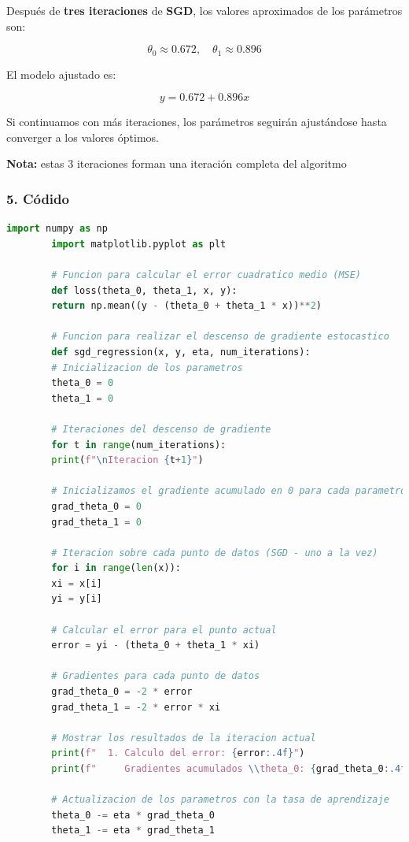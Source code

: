 \documentclass[a5paper]{article}
\begin{document}
	
	Después de \textbf{tres iteraciones} de \textbf{SGD}, los valores aproximados de los parámetros son:
	
	\[
	\theta_0 \approx 0.672, \quad \theta_1 \approx 0.896
	\]
	
	El modelo ajustado es:
	
	\[
	y = 0.672 + 0.896x
	\]
	
	Si continuamos con más iteraciones, los parámetros seguirán ajustándose hasta converger a los valores óptimos.
	
	\textbf{Nota:} estas 3 iteraciones forman una iteración completa del algoritmo
	
	\subsubsection*{5. Códido}
	\begin{lstlisting}[language=Python, caption=Regresión Lineal con SGD, frame=single]
		import numpy as np
		import matplotlib.pyplot as plt
		
		# Funcion para calcular el error cuadratico medio (MSE)
		def loss(theta_0, theta_1, x, y):
		return np.mean((y - (theta_0 + theta_1 * x))**2)
		
		# Funcion para realizar el descenso de gradiente estocastico
		def sgd_regression(x, y, eta, num_iterations):
		# Inicializacion de los parametros
		theta_0 = 0
		theta_1 = 0
		
		# Iteraciones del descenso de gradiente
		for t in range(num_iterations):
		print(f"\nIteracion {t+1}")
		
		# Inicializamos el gradiente acumulado en 0 para cada parametro
		grad_theta_0 = 0
		grad_theta_1 = 0
		
		# Iteracion sobre cada punto de datos (SGD - uno a la vez)
		for i in range(len(x)):
		xi = x[i]
		yi = y[i]
		
		# Calcular el error para el punto actual
		error = yi - (theta_0 + theta_1 * xi)
		
		# Gradientes para cada punto de datos
		grad_theta_0 = -2 * error
		grad_theta_1 = -2 * error * xi
		
		# Mostrar los resultados de la iteracion actual
		print(f"  1. Calculo del error: {error:.4f}")
		print(f"     Gradientes acumulados \\theta_0: {grad_theta_0:.4f}, \\theta_1: {grad_theta_1:.4f}")
		
		# Actualizacion de los parametros con la tasa de aprendizaje
		theta_0 -= eta * grad_theta_0
		theta_1 -= eta * grad_theta_1
		

\end{lstlisting}
\end{document}

